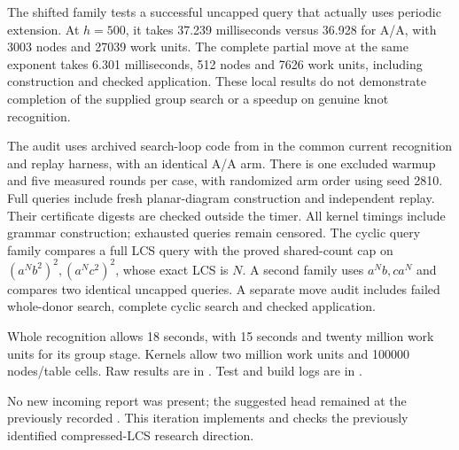 The shifted family tests a successful uncapped query that actually uses
periodic extension. At $h=500$, it takes 37.239 milliseconds versus
36.928 for A/A, with 3003 nodes and 27039 work units. The complete partial
move at the same exponent takes 6.301 milliseconds, 512 nodes and 7626
work units, including construction and checked application. These local
results do not demonstrate completion of the supplied group search or a
speedup on genuine knot recognition.


The audit uses archived search-loop code from  in the
common current recognition and replay harness, with an identical A/A arm.
There is one excluded warmup and five measured rounds per case, with
randomized arm order using seed 2810. Full queries include fresh planar-diagram
construction and independent replay. Their certificate digests are checked
outside the timer. All kernel timings include grammar construction; exhausted
queries remain censored. The cyclic query family compares a full LCS query
with the proved shared-count cap on $(a^N b^2)^2,(a^N c^2)^2$, whose exact
LCS is $N$. A second family uses $a^N b,c a^N$ and compares two identical
uncapped queries. A separate move audit includes failed whole-donor search,
complete cyclic search and checked application.

Whole recognition allows 18 seconds, with 15 seconds and twenty million
work units for its group stage. Kernels allow two million work units and
100000 nodes/table cells. Raw results are in
.
Test and build logs are in .

No new incoming report was present; the suggested 
head remained at the previously recorded . This iteration implements
and checks the previously identified compressed-LCS research direction.
